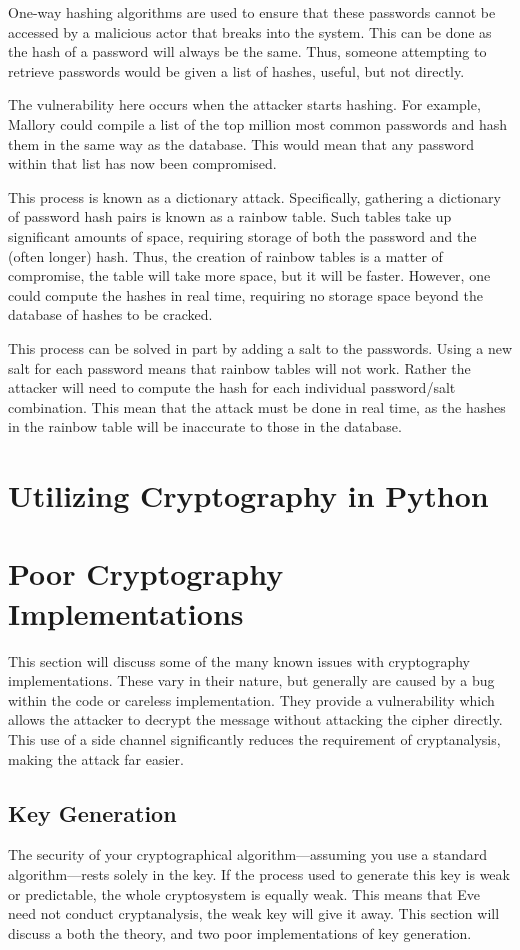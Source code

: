 		One-way hashing algorithms are used to ensure that these passwords cannot be accessed by a malicious actor that breaks into the system. 
		This can be done as the hash of a password will always be the same. 
		Thus, someone attempting to retrieve passwords would be given a list of hashes, useful, but not directly. 

		The vulnerability here occurs when the attacker starts hashing. 
		For example, Mallory could compile a list of the top million most common passwords and hash them in the same way as the database. 
		This would mean that any password within that list has now been compromised. 

		This process is known as a dictionary attack. 
		Specifically, gathering a dictionary of password hash pairs is known as a rainbow table. 
		Such tables take up significant amounts of space, requiring storage of both the password and the (often longer) hash. 
		Thus, the creation of rainbow tables is a matter of compromise, the table will take more space, but it will be faster. 
		However, one could compute the hashes in real time, requiring no storage space beyond the database of hashes to be cracked.

		This process can be solved in part by adding a salt to the passwords. 
		Using a new salt for each password means that rainbow tables will not work. 
		Rather the attacker will need to compute the hash for each individual password/salt combination. 
		This mean that the attack must be done in real time, as the hashes in the rainbow table will be inaccurate to those in the database. 
	\section{Utilizing Cryptography in Python}
	\section{Poor Cryptography Implementations}
		This section will discuss some of the many known issues with cryptography implementations. 
		These vary in their nature, but generally are caused by a bug within the code or careless implementation. 
		They provide a vulnerability which allows the attacker to decrypt the message without attacking the cipher directly. 
		This use of a side channel significantly reduces the requirement of cryptanalysis, making the attack far easier. 
		\subsection{Key Generation}
			The security of your cryptographical algorithm---assuming you use a standard algorithm---rests solely in the key. 
			If the process used to generate this key is weak or predictable, the whole cryptosystem is equally weak. 
			This means that Eve need not conduct cryptanalysis, the weak key will give it away. 
			This section will discuss a both the theory, and two poor implementations of key generation. 

